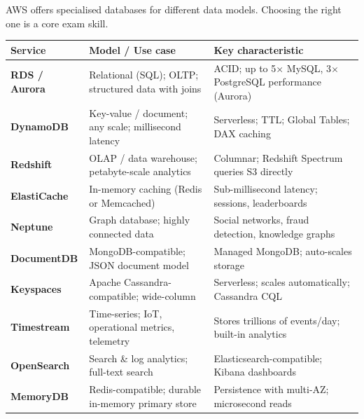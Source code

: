 

AWS offers specialised databases for different data models. Choosing the right one is a
core exam skill.

\begin{comparebox}[title={Purpose-built database selection guide}]
\begin{tabular}{@{}p{3.5cm}p{4cm}p{4cm}@{}}
\toprule
\textbf{Service} & \textbf{Model / Use case} & \textbf{Key characteristic} \\
\midrule
\textbf{RDS / Aurora}    & Relational (SQL); OLTP; structured data with joins &
  ACID; up to 5$\times$ MySQL, 3$\times$ PostgreSQL performance (Aurora) \\[4pt]
\textbf{DynamoDB}        & Key-value / document; any scale; millisecond latency &
  Serverless; TTL; Global Tables; DAX caching \\[4pt]
\textbf{Redshift}        & OLAP / data warehouse; petabyte-scale analytics &
  Columnar; Redshift Spectrum queries S3 directly \\[4pt]
\textbf{ElastiCache}     & In-memory caching (Redis or Memcached) &
  Sub-millisecond latency; sessions, leaderboards \\[4pt]
\textbf{Neptune}         & Graph database; highly connected data &
  Social networks, fraud detection, knowledge graphs \\[4pt]
\textbf{DocumentDB}      & MongoDB-compatible; JSON document model &
  Managed MongoDB; auto-scales storage \\[4pt]
\textbf{Keyspaces}       & Apache Cassandra-compatible; wide-column &
  Serverless; scales automatically; Cassandra CQL \\[4pt]
\textbf{Timestream}      & Time-series; IoT, operational metrics, telemetry &
  Stores trillions of events/day; built-in analytics \\[4pt]
\textbf{OpenSearch}      & Search \& log analytics; full-text search &
  Elasticsearch-compatible; Kibana dashboards \\[4pt]
\textbf{MemoryDB}        & Redis-compatible; durable in-memory primary store &
  Persistence with multi-AZ; microsecond reads \\
\bottomrule
\end{tabular}
\end{comparebox}

